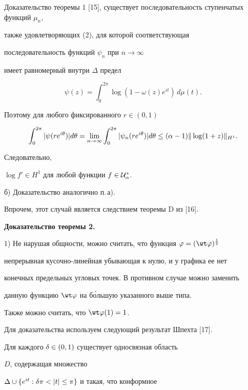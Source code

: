 \begin{pf*}{Доказательство теоремы 1}
[15], существует последовательность ступенчатых функций $\mu_n$,


также удовлетворяющих (2), для которой соответствующая


последовательность функций $\psi_n$ при $n\to\infty$


имеет равномерный внутри $\Delta$ предел


$$


\psi(z)=\int_0^{2\pi}\log(1-\omega(z)e^{it})\, d\mu(t).


$$


Поэтому для любого фиксированного $r\in(0,1)$


$$


\int_0^{2\pi}|\psi(re^{i\theta})| d\theta=


\lim_{n\to\infty}\int_0^{2\pi}|\psi_n(re^{i\theta})|d\theta\leq


(\al-1)\|\log (1+z)\|_{H^1}.


$$


Следовательно,


$\log f'\in H^1$ для любой функции $f\in\cal U_\alpha^\ast$.





б) Доказательство аналогично п.\,а).


Впрочем, этот случай является следствием теоремы D из [16].


\end{pf*}








{\bf Доказательство теоремы 2.}


1) Не нарушая общности, можно считать, что функция $\p=(\wt\p)^{\frac 12}$


непрерывная кусочно-линейная убывающая к нулю, и у графика ее нет


конечных предельных угловых точек. В противном случае можно заменить


данную функцию $\wt\p$ на б\'ольшую указанного выше типа.


Также можно считать, что $\wt\p(1)=1$.





Для доказательства используем следующий результат Шпехта [17].


Для каждого $\delta\in (0,1)$ существует односвязная область


$D$, содержащая множество


$\De\cup\{e^{it}: \de\pi<|t|\leq\pi\}$ и такая, что конформное


